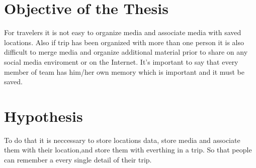 \section{Objective of the Thesis}
For travelers it is not easy to organize media and associate media with saved locations. Also if trip has been organized with more than one person it is also difficult to merge media and organize additional material prior to share on any social media enviroment or on the Internet. It's important to say that every member of team has him/her own memory which is important and it must be saved.

\section{Hypothesis}
To do that it is neccessary to store locations data, store media and associate them with their location,and store them with everthing in a trip. So that people can remember a every single detail of their trip.